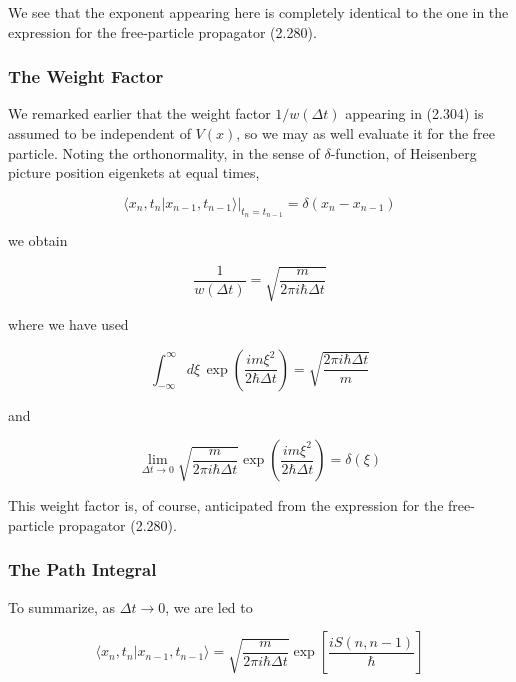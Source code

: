 \documentclass[11pt,a4paper]{article}
\begin{document}
We see that the exponent appearing here is completely identical to the one in the expression for the free-particle propagator (2.280).

\subsubsection{The Weight Factor}

We remarked earlier that the weight factor $1/w(\Delta t)$ appearing in (2.304) is assumed to be independent of $V(x)$, so we may as well evaluate it for the free particle. Noting the orthonormality, in the sense of $\delta$-function, of Heisenberg picture position eigenkets at equal times,

\begin{equation}
\langle x_n, t_n|x_{n-1}, t_{n-1}\rangle|_{t_n = t_{n-1}} = \delta(x_n - x_{n-1})
\tag{2.307}
\end{equation}

we obtain

\begin{equation}
\boxed{\frac{1}{w(\Delta t)} = \sqrt{\frac{m}{2\pi i\hbar\Delta t}}}
\tag{2.308}
\end{equation}

where we have used

\begin{equation}
\int_{-\infty}^{\infty} d\xi\,\exp\left(\frac{im\xi^2}{2\hbar\Delta t}\right) = \sqrt{\frac{2\pi i\hbar\Delta t}{m}}
\tag{2.309a}
\end{equation}

and

\begin{equation}
\lim_{\Delta t \to 0}\sqrt{\frac{m}{2\pi i\hbar\Delta t}}\exp\left(\frac{im\xi^2}{2\hbar\Delta t}\right) = \delta(\xi)
\tag{2.309b}
\end{equation}

This weight factor is, of course, anticipated from the expression for the free-particle propagator (2.280).

\subsubsection{The Path Integral}

To summarize, as $\Delta t \to 0$, we are led to

\begin{equation}
\langle x_n, t_n|x_{n-1}, t_{n-1}\rangle = \sqrt{\frac{m}{2\pi i\hbar\Delta t}}\exp\left[\frac{iS(n, n-1)}{\hbar}\right]
\tag{2.310}
\end{equation}
\end{document}
